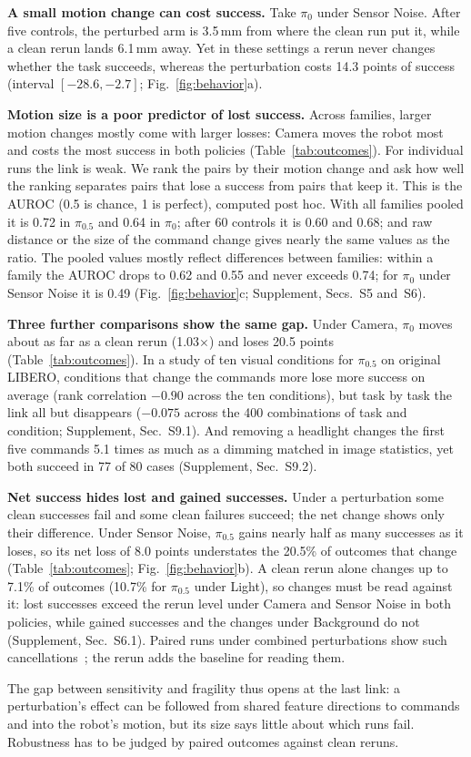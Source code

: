 \textbf{A small motion change can cost success.} Take $\pi_0$ under Sensor Noise. After five controls, the perturbed arm is 3.5\,mm from where the clean run put it, while a clean rerun lands 6.1\,mm away. Yet in these settings a rerun never changes whether the task succeeds, whereas the perturbation costs 14.3 points of success (interval $[-28.6,-2.7]$; Fig.~\ref{fig:behavior}a).

\textbf{Motion size is a poor predictor of lost success.} Across families, larger motion changes mostly come with larger losses: Camera moves the robot most and costs the most success in both policies (Table~\ref{tab:outcomes}). For individual runs the link is weak. We rank the pairs by their motion change and ask how well the ranking separates pairs that lose a success from pairs that keep it. This is the AUROC (0.5 is chance, 1 is perfect), computed post hoc. With all families pooled it is 0.72 in $\pi_{0.5}$ and 0.64 in $\pi_0$; after 60 controls it is 0.60 and 0.68; and raw distance or the size of the command change gives nearly the same values as the ratio. The pooled values mostly reflect differences between families: within a family the AUROC drops to 0.62 and 0.55 and never exceeds 0.74; for $\pi_0$ under Sensor Noise it is 0.49 (Fig.~\ref{fig:behavior}c; Supplement, Secs.~S5 and~S6).

\textbf{Three further comparisons show the same gap.} Under Camera, $\pi_0$ moves about as far as a clean rerun (1.03$\times$) and loses 20.5 points (Table~\ref{tab:outcomes}). In a study of ten visual conditions for $\pi_{0.5}$ on original LIBERO, conditions that change the commands more lose more success on average (rank correlation $-0.90$ across the ten conditions), but task by task the link all but disappears ($-0.075$ across the 400 combinations of task and condition; Supplement, Sec.~S9.1). And removing a headlight changes the first five commands 5.1 times as much as a dimming matched in image statistics, yet both succeed in 77 of 80 cases (Supplement, Sec.~S9.2).

\textbf{Net success hides lost and gained successes.} Under a perturbation some clean successes fail and some clean failures succeed; the net change shows only their difference. Under Sensor Noise, $\pi_{0.5}$ gains nearly half as many successes as it loses, so its net loss of 8.0 points understates the 20.5\% of outcomes that change (Table~\ref{tab:outcomes}; Fig.~\ref{fig:behavior}b). A clean rerun alone changes up to 7.1\% of outcomes (10.7\% for $\pi_{0.5}$ under Light), so changes must be read against it: lost successes exceed the rerun level under Camera and Sensor Noise in both policies, while gained successes and the changes under Background do not (Supplement, Sec.~S6.1). Paired runs under combined perturbations show such cancellations~\cite{sawada2026paired}; the rerun adds the baseline for reading them.

The gap between sensitivity and fragility thus opens at the last link: a perturbation's effect can be followed from shared feature directions to commands and into the robot's motion, but its size says little about which runs fail. Robustness has to be judged by paired outcomes against clean reruns.
